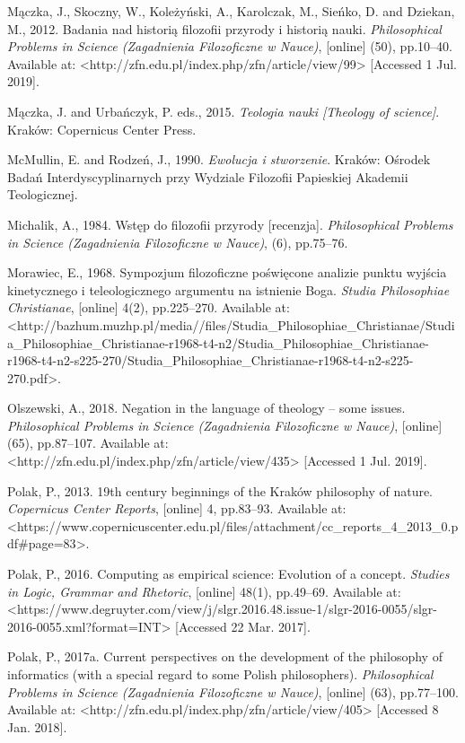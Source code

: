 \documentclass[a4paper]{article}
\begin{document}
Mączka, J., Skoczny, W., Koleżyński, A., Karolczak, M., Sieńko, D. and Dziekan, M., 2012. Badania nad historią filozofii
przyrody i historią nauki. \textit{Philosophical Problems in Science (Zagadnienia Filozoficzne w Nauce)}, [online]
(50), pp.10–40. Available at: {\textless}http://zfn.edu.pl/index.php/zfn/article/view/99{\textgreater} [Accessed 1 Jul.
2019].

Mączka, J. and Urbańczyk, P. eds., 2015. \textit{Teologia nauki [Theology of science]}. Kraków: Copernicus Center Press.

McMullin, E. and Rodzeń, J., 1990. \textit{Ewolucja i stworzenie}. Kraków: Ośrodek Badań Interdyscyplinarnych przy
Wydziale Filozofii Papieskiej Akademii Teologicznej.

Michalik, A., 1984. Wstęp do filozofii przyrody [recenzja]. \textit{Philosophical Problems in Science (Zagadnienia
Filozoficzne w Nauce)}, (6), pp.75–76.

Morawiec, E., 1968. Sympozjum filozoficzne poświęcone analizie punktu wyjścia kinetycznego i teleologicznego argumentu
na istnienie Boga. \textit{Studia Philosophiae Christianae}, [online] 4(2), pp.225–270. Available at:
{\textless}http://bazhum.muzhp.pl/media//files/Studia\_Philosophiae\_Christianae/Studia\_Philosophiae\_Christianae-r1968-t4-n2/Studia\_Philosophiae\_Christianae-r1968-t4-n2-s225-270/Studia\_Philosophiae\_Christianae-r1968-t4-n2-s225-270.pdf{\textgreater}.

Olszewski, A., 2018. Negation in the language of theology – some issues. \textit{Philosophical Problems in Science
(Zagadnienia Filozoficzne w Nauce)}, [online] (65), pp.87–107. Available at:
{\textless}http://zfn.edu.pl/index.php/zfn/article/view/435{\textgreater} [Accessed 1 Jul. 2019].

Polak, P., 2013. 19th century beginnings of the Kraków philosophy of nature. \textit{Copernicus Center Reports},
[online] 4, pp.83–93. Available at:
{\textless}https://www.copernicuscenter.edu.pl/files/attachment/cc\_reports\_4\_2013\_0.pdf\#page=83{\textgreater}.

Polak, P., 2016. Computing as empirical science: Evolution of a concept. \textit{Studies in Logic, Grammar and
Rhetoric}, [online] 48(1), pp.49–69. Available at:
{\textless}https://www.degruyter.com/view/j/slgr.2016.48.issue-1/slgr-2016-0055/slgr-2016-0055.xml?format=INT{\textgreater}
[Accessed 22 Mar. 2017].

Polak, P., 2017a. Current perspectives on the development of the philosophy of informatics (with a special regard to
some Polish philosophers). \textit{Philosophical Problems in Science (Zagadnienia Filozoficzne w Nauce)}, [online]
(63), pp.77–100. Available at: {\textless}http://zfn.edu.pl/index.php/zfn/article/view/405{\textgreater} [Accessed 8
Jan. 2018].
\end{document}
